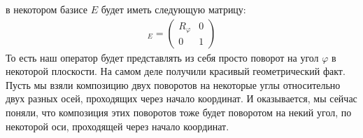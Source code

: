 \begin{enumerate}
    в некотором базисе $E$ будет иметь следующую матрицу:
    \begin{gather*}
        [\A]_{E} = \left(\begin{array}{cc}
            R_{\varphi} & 0 \\ 
            0 & 1 
        \end{array}\right)
    \end{gather*}
    То есть наш оператор будет представлять из себя просто поворот на угол $\varphi$ в некоторой плоскости. 
    На самом деле получили красивый геометрический факт. Пусть мы взяли композицию двух поворотов на некоторые 
    углы относительно двух разных осей, проходящих через начало координат. И оказывается, мы сейчас поняли, 
    что композиция этих поворотов тоже будет поворотом на некий угол, по некоторой оси, проходящей через начало координат. 
\end{enumerate}


